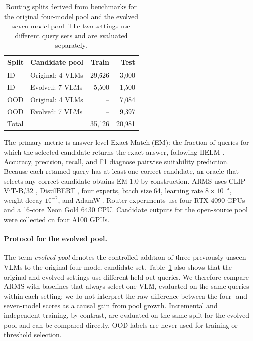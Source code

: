 \documentclass[letterpaper]{article}
\begin{document}
\begin{table}[t]
\centering
\begin{tabular}{llrr}
\toprule
Split & Candidate pool & Train & Test\\
\midrule
ID  & Original: 4 VLMs & 29,626 & 3,000\\
ID  & Evolved: 7 VLMs  & 5,500  & 1,500\\
OOD & Original: 4 VLMs & --     & 7,084\\
OOD & Evolved: 7 VLMs  & --     & 9,397\\
\midrule
Total & & 35,126 & 20,981\\
\bottomrule
\end{tabular}
\vspace{-3mm}
\caption{Routing splits derived from benchmarks for the original four-model pool and
the evolved seven-model pool. The two settings use different query sets and are
evaluated separately.}
\label{tab:data}
\end{table}

The primary metric is answer-level Exact Match (EM): the fraction of queries for
which the selected candidate returns the exact answer, following HELM
\citep{HELM}. Accuracy, precision, recall, and F1 diagnose pairwise suitability
prediction. Because each retained query has at least one correct candidate, an
oracle that selects any correct candidate obtains EM 1.0 by construction. ARMS
uses CLIP-ViT-B/32 \citep{clip},
DistilBERT \citep{DistilBERT}, four experts, batch size 64, learning rate
$8\times10^{-5}$, weight decay $10^{-2}$, and AdamW \citep{AdamW}. Router
experiments use four RTX 4090 GPUs and a 16-core Xeon Gold 6430 CPU. Candidate
outputs for the open-source pool were collected on four A100 GPUs.

\paragraph{Protocol for the evolved pool.}
The term \emph{evolved pool} denotes the controlled addition of three previously
unseen VLMs to the original four-model candidate set. Table~\ref{tab:data}
also shows that the original and evolved settings use different held-out
queries. We therefore compare ARMS with baselines that always select one VLM,
evaluated on the same queries within each setting; we do not interpret the raw difference
between the four- and seven-model scores as a causal gain from pool growth.
Incremental and independent training, by contrast, are evaluated on the same
split for the evolved pool and can be compared directly. OOD labels are never used for
training or threshold selection.
\end{document}
